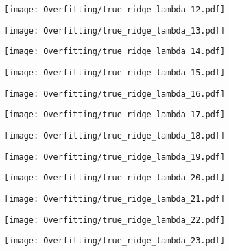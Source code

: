 \documentclass[xcolor=pdftex,dvipsnames,table]{beamer}
\begin{document}
\frame
{
	\begin{center}
		\texttt{[image: Overfitting/true\_ridge\_lambda\_12.pdf]}
	\end{center}
}

\frame
{
	\begin{center}
		\texttt{[image: Overfitting/true\_ridge\_lambda\_13.pdf]}
	\end{center}
}

\frame
{
	\begin{center}
		\texttt{[image: Overfitting/true\_ridge\_lambda\_14.pdf]}
	\end{center}
}

\frame
{
	\begin{center}
		\texttt{[image: Overfitting/true\_ridge\_lambda\_15.pdf]}
	\end{center}
}

\frame
{
	\begin{center}
		\texttt{[image: Overfitting/true\_ridge\_lambda\_16.pdf]}
	\end{center}
}

\frame
{
	\begin{center}
		\texttt{[image: Overfitting/true\_ridge\_lambda\_17.pdf]}
	\end{center}
}

\frame
{
	\begin{center}
		\texttt{[image: Overfitting/true\_ridge\_lambda\_18.pdf]}
	\end{center}
}

\frame
{
	\begin{center}
		\texttt{[image: Overfitting/true\_ridge\_lambda\_19.pdf]}
	\end{center}
}

\frame
{
	\begin{center}
		\texttt{[image: Overfitting/true\_ridge\_lambda\_20.pdf]}
	\end{center}
}

\frame
{
	\begin{center}
		\texttt{[image: Overfitting/true\_ridge\_lambda\_21.pdf]}
	\end{center}
}

\frame
{
	\begin{center}
		\texttt{[image: Overfitting/true\_ridge\_lambda\_22.pdf]}
	\end{center}
}

\frame
{
	\begin{center}
		\texttt{[image: Overfitting/true\_ridge\_lambda\_23.pdf]}
	\end{center}
}
\end{document}
